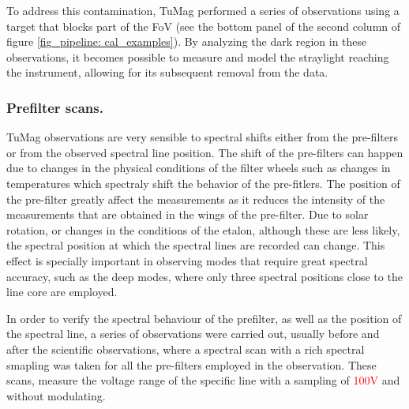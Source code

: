 To address this contamination, TuMag performed a series of observations using a target that blocks part of the FoV (see the bottom panel of the second column of figure \ref{fig_pipeline: cal_examples}). By analyzing the dark region in these observations, it becomes possible to measure and model the straylight reaching the instrument, allowing for its subsequent removal from the data.

\subsubsection{Prefilter scans.}

TuMag observations are very sensible to spectral shifts either from the pre-filters or from the observed spectral line position. The shift of the pre-filters can happen due to changes in the physical conditions of the filter wheels such as changes in temperatures which spectraly shift the behavior of the pre-fitlers. The position of the pre-filter greatly affect the measurements as it reduces the intensity of the measurements that are obtained in the wings of the pre-filter. Due to solar rotation, or changes in the conditions of the etalon, although these are less likely, the spectral position at which the spectral lines are recorded can change. This effect is specially important in observing modes that require great spectral accuracy, such as the deep modes, where only three spectral positions close to the line core are employed. 

In order to verify the spectral behaviour of the prefilter, as well as the position of the spectral line, a series of observations were carried out, usually before and after the scientific observations, where a spectral scan with a rich spectral smapling was taken for all the pre-filters employed in the observation. These scans, measure the voltage range of the specific line with a sampling of \textcolor{red}{100V} and without modulating. 

